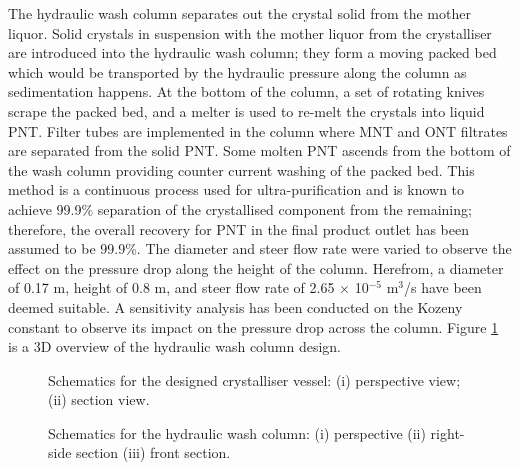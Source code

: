 The hydraulic wash column separates out the crystal solid from the mother liquor. Solid crystals in suspension with the mother liquor from the crystalliser are introduced into the hydraulic wash column; they form a moving packed bed which would be transported by the hydraulic pressure along the column as sedimentation happens. At the bottom of the column, a set of rotating knives scrape the packed bed, and a melter is used to re-melt the crystals into liquid PNT. Filter tubes are implemented in the column where MNT and ONT filtrates are separated from the solid PNT. Some molten PNT ascends from the bottom of the wash column providing counter current washing of the packed bed. This method is a continuous process used for ultra-purification and is known to achieve 99.9\% separation of the crystallised component from the remaining; therefore, the overall recovery for PNT in the final product outlet has been assumed to be 99.9\%. The diameter and steer flow rate were varied to observe the effect on the pressure drop along the height of the column. Herefrom, a diameter of 0.17 m, height of 0.8 m, and steer flow rate of 2.65 $\times$ 10$^{-5}$ m$^{3}$/s have been deemed suitable. A sensitivity analysis has been conducted on the Kozeny constant to observe its impact on the pressure drop across the column. Figure \ref{fig:wash column schematic executive} is a 3D overview of the hydraulic wash column design.


\begin{figure}[h]
    \centering
    \begin{minipage}{0.5\textwidth}
        
        \caption{Schematics for the designed crystalliser vessel: (i) perspective view; (ii) section view.}
        \label{fig:crystalliser schematic executive}
    \end{minipage}%
    \begin{minipage}{0.5\textwidth}
        
        \caption{Schematics for the hydraulic wash column: (i) perspective (ii) right-side section (iii) front section.}
        \label{fig:wash column schematic executive}
    \end{minipage}
\end{figure}
